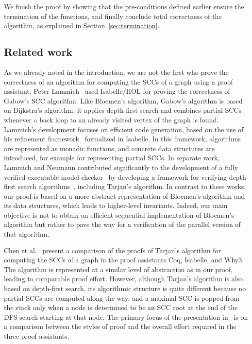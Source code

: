\documentclass[sigplan,10pt,anonymous,review]{acmart}
\begin{document}
We finish the proof by showing that the pre-conditions defined earlier ensure the termination of the functions, and finally conclude total correctness of the algorithm, as explained in Section~\ref{sec:termination}.


\subsection{Related work}
\label{sec:related}

As we already noted in the introduction, we are not the first who prove the correctness of an algorithm for computing the SCCs of a graph using a proof assistant. Peter Lammich~\cite{lammich:gabow} used Isabelle/HOL for proving the correctness of Gabow's SCC algorithm. Like Bloemen's algorithm, Gabow's algorithm is based on Dijkstra's algorithm: it applies depth-first search and combines partial SCCs whenever a back loop to an already visited vertex of the graph is found. Lammich's development focuses on efficient code generation, based on the use of his refinement framework~\cite{lammich:refinement} formalized in Isabelle. In this framework, algorithms are represented as monadic functions, and concrete data structures are introduced, for example for representing partial SCCs. In separate work, Lammich and Neumann contributed significantly to the development of a fully verified executable model checker~\cite{esparza:cava} by developing a framework for verifying depth-first search algorithms~\cite{lammich:depth-first}, including Tarjan's algorithm. In contrast to these works, our proof is based on a more abstract representation of Bloemen's algorithm and its data structures, which leads to higher-level invariants. Indeed, our main objective is not to obtain an efficient sequential implementation of Bloemen's algorithm but rather to pave the way for a verification of the parallel version of that algorithm.

Chen et al.~\cite{chen:tarjan} present a comparison of the proofs of Tarjan's algorithm for computing the SCCs of a graph in the proof assistants Coq, Isabelle, and Why3. The algorithm is represented at a similar level of abstraction as in our proof, leading to comparable proof effort. However, although Tarjan's algorithm is also based on depth-first search, its algorithmic structure is quite different because no partial SCCs are computed along the way, and a maximal SCC is popped from the stack only when a node is determined to be an SCC root at the end of the DFS search starting at that node. The primary focus of the presentation in~\cite{chen:tarjan} is on a comparison between the styles of proof and the overall effort required in the three proof assistants.
\end{document}
